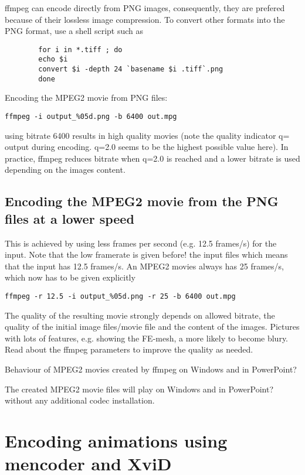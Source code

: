  ffmpeg can encode directly from PNG images, consequently, they are
prefered because of their lossless image compression. To convert other
formats into the PNG format, use a shell script such as

\begin{verbatim}
        for i in *.tiff ; do
        echo $i
        convert $i -depth 24 `basename $i .tiff`.png
        done
\end{verbatim}

Encoding the MPEG2 movie from PNG files:

\begin{verbatim}
ffmpeg -i output_%05d.png -b 6400 out.mpg
\end{verbatim}

 using bitrate 6400 results in high quality movies (note the quality
indicator q= output during encoding. q=2.0 seems to be the highest
possible value here). In practice, ffmpeg reduces bitrate when q=2.0
is reached and a lower bitrate is used depending on the images
content.

\subsection{Encoding the MPEG2 movie from the PNG files at a lower speed}

 This is achieved by using less frames per second (e.g. 12.5 frames/s)
for the input. Note that the low framerate is given before! the input
files which means that the input has 12.5 frames/s. An MPEG2 movies
always has 25 frames/s, which now has to be given explicitly

\begin{verbatim}
ffmpeg -r 12.5 -i output_%05d.png -r 25 -b 6400 out.mpg
\end{verbatim}

 The quality of the resulting movie strongly depends on allowed
bitrate, the quality of the initial image files/movie file and the
content of the images. Pictures with lots of features, e.g. showing
the FE-mesh, a more likely to become blury. Read about the ffmpeg
parameters to improve the quality as needed.

 Behaviour of MPEG2 movies created by ffmpeg on Windows and in
PowerPoint?

 The created MPEG2 movie files will play on Windows and in PowerPoint?
without any additional codec installation.

\section{Encoding animations using mencoder and XviD}

